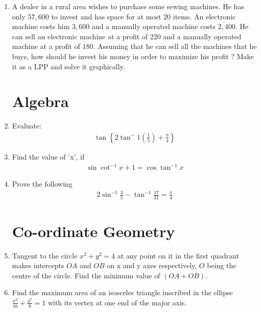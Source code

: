 \documentclass[12pt,-letter paper]{article}
\providecommand{\cbrak}[1]{\ensuremath{\left\{#1\right\}}}
\providecommand{\brak}[1]{\ensuremath{\left(#1\right)}}
\providecommand{\brak}[1]{\ensuremath{\left(#1\right)}}
\begin{document}
\begin{enumerate}
 
    \item A dealer in a rural area wishes to purchase some sewing machines. He has only  \rupee $57,600$ to invest and has space for at most 20 items. An electronic machine costs him \rupee $3,600$ and a manually operated machine costs \rupee $2,400$. He can sell an electronic machine at a profit of 220 and a manually operated machine at a profit of \rupee $180$. Assuming that he can sell all the machines that he buys, how should he invest his money in order to maximize his profit ? Make it as a LPP and solve it graphically.	

\section{Algebra}
	\item Evaluate:
    \begin{align*}
        \tan\cbrak{2\tan^-1{\brak{\frac{1}{5}}}+\frac{\pi}{4}}
    \end{align*}

	\item Find the value of 'x', if
 \begin{align*}
     \sin{\cot^{-1}{x+1}} = \cos{\tan^{-1}{x}}
 \end{align*}
 
	\item Prove the following
	\begin{align*}
		2\sin^{-1}{\frac{3}{5}}-\tan^{-1}{\frac{17}{31}} = \frac{\pi}{4}
	\end{align*}

\section{Co-ordinate Geometry}
    \item Tangent to the circle $x^2 + y^2 = 4$ at any point on it in the first quadrant makes intercepts $OA$ and $OB$ on x and y axes respectively, $O$ being the centre of the circle. Find the minimum value of $(OA + OB)$.
    \item Find the maximum area of an isosceles triangle inscribed in the ellipse $\frac{x^2}{16}+\frac{y^2}{9} = 1$ with its vertex at one end of the major axis.
\end{enumerate}
\end{document}
